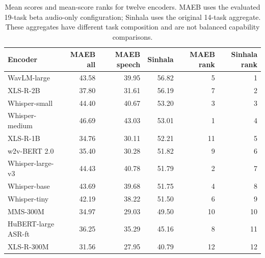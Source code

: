 \begin{table}[t]
\centering\small
\begin{tabular}{lrrrrr}\toprule
Encoder & MAEB all & MAEB speech & Sinhala & MAEB rank & Sinhala rank \\\midrule
WavLM-large & 43.58 & 39.95 & 56.82 & 5 & 1 \\
XLS-R-2B & 37.80 & 31.61 & 56.19 & 7 & 2 \\
Whisper-small & 44.40 & 40.67 & 53.20 & 3 & 3 \\
Whisper-medium & 46.69 & 43.03 & 53.01 & 1 & 4 \\
XLS-R-1B & 34.76 & 30.11 & 52.21 & 11 & 5 \\
w2v-BERT 2.0 & 35.40 & 30.28 & 51.82 & 9 & 6 \\
Whisper-large-v3 & 44.43 & 40.78 & 51.79 & 2 & 7 \\
Whisper-base & 43.69 & 39.68 & 51.75 & 4 & 8 \\
Whisper-tiny & 42.19 & 38.22 & 51.50 & 6 & 9 \\
MMS-300M & 34.97 & 29.03 & 49.50 & 10 & 10 \\
HuBERT-large ASR-ft & 36.25 & 35.29 & 45.16 & 8 & 11 \\
XLS-R-300M & 31.56 & 27.95 & 40.79 & 12 & 12 \\
\bottomrule\end{tabular}
\caption{Mean scores and mean-score ranks for twelve encoders. MAEB uses the evaluated 19-task beta audio-only configuration; Sinhala uses the original 14-task aggregate. These aggregates have different task composition and are not balanced capability comparisons.}
\label{tab:maeb}\end{table}
